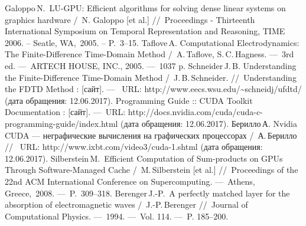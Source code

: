 {\def\section*#1{}
\begin{thebibliography}{99}
 Galoppo\,N.~LU-GPU: Efficient algorithms for solving dense linear systems on graphics hardware /~N. Galoppo [et al.] //~Proceedings - Thirteenth International Symposium on Temporal Representation and Reasoning, TIME 2006. -- Seatle, WA,~2005. -- P.~3--15.
 Taflove\,A. Computational Electrodynamics: The Finite-Difference Time-Domain Method /~A.\,Taflove, S.\,C.\,Hagness. ---~3rd ed. ---~ARTECH HOUSE, INC., 2005. ---~1037 p.
 Schneider\,J.\,B. Understanding the Finite-Difference Time-Domain Method /~J.\,B.\,Schneider. //~Understanding the FDTD Method : [сайт]. ---~ URL: http://www.eecs.wsu.edu/\textasciitilde{}schneidj/ufdtd/ (дата обращения: 12.06.2017).
 Programming Guide :: CUDA Toolkit Documentation : [сайт]. ---~URL: http://docs.nvidia.com/cuda/cuda-c-programming-guide/index.html (дата обращения: 12.06.2017).
 Берилло\,А. Nvidia CUDA --- неграфические вычисления на графических процессорах /~А.\,Берилло //~ URL: http://www.ixbt.com/video3/cuda-1.shtml  (дата обращения: 12.06.2017).
 Silberstein\,M.~Efficient Computation of Sum-products on GPUs Through
Software-Managed Cache /~M.\,Silberstein [et al.] //~Proceedings of the 22nd ACM International Conference on Supercomputing. ---~Athens, Greece,~2008. ---~P.~309--318.
 Berenger\,J.-P.~A perfectly matched layer for the absorption of electromagnetic waves /~J.-P.\,Berenger //~Journal of Computational Physics. ---~1994. ---~Vol. 114. ---~P. 185--200.
\end{thebibliography}
}
\clearpage
